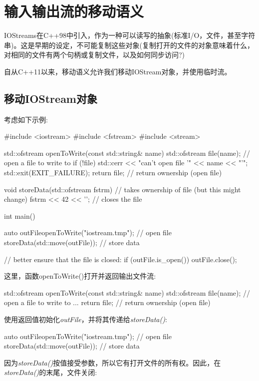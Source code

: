 \section{输入输出流的移动语义}
IOStreams在C++98中引入，作为一种可以读写的抽象(标准I/O，文件，甚至字符串)。这是早期的设定，不可能复制这些对象(复制打开的文件的对象意味着什么，对相同的文件有两个句柄或复制文件，以及如何同步访问?)

自从C++11以来，移动语义允许我们移动IOStream对象，并使用临时流。

\subsection{移动IOStream对象}

考虑如下示例:

\begin{cppcode}
#include <iostream>
#include <fstream>
#include <stream>

std::ofstream openToWrite(const std::string& name)
{
	std::ofstream file(name); // open a file to write to
	if (!file) {
		std::cerr << "can't open file '" << name << "'\n";
		std::exit(EXIT_FAILURE);
	}
	return file; // return ownership (open file)
}

void storeData(std::ofstream fstrm) // takes ownership of file (but this might change)
{
	fstrm << 42 << '\n';
} // closes the file

int main()
{
	auto outFile{openToWrite("iostream.tmp")}; // open file
	storeData(std::move(outFile)); // store data
	
	// better ensure that the file is closed:
	if (outFile.is_open()) {
		outFile.close();
	}
}
\end{cppcode}

这里，函数openToWrite()打开并返回输出文件流:

\begin{cppcode}
std::ofstream openToWrite(const std::string& name)
{
	std::ofstream file(name); // open a file to write to
	...
	return file; // return ownership (open file)
}
\end{cppcode}

使用返回值初始化\textit{outFile}，并将其传递给\textit{storeData()}:

\begin{cppcode}
auto outFile{openToWrite("iostream.tmp")}; // open file
storeData(std::move(outFile)); // store data
\end{cppcode}

因为\textit{storeData()}按值接受参数，所以它有打开文件的所有权。因此，在\textit{storeData()}的末尾，文件关闭:

